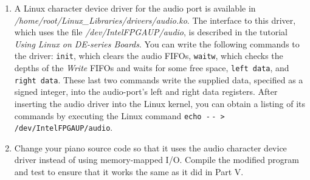 \documentclass[epsfig,10pt,fullpage]{article}
\newcommand{\CommonDocsPath}{../../common/docs}
\begin{document}
\begin{enumerate}
\item A Linux character device driver for the audio port is available in 
{\it /home/root/Linux\_Libraries/drivers/audio.ko}. The interface to this driver, which uses the
file {\it /dev/IntelFPGAUP/audio}, is described in the tutorial {\it Using Linux on 
DE-series Boards}. You can write the following commands to the driver: \texttt{init}, 
which clears the audio 
FIFOs, \texttt{waitw}, which checks the depths of the {\it Write} FIFOs and waits for some 
free space, \texttt{left data}, and \texttt{right data}. These last two commands write the 
supplied data, specified as a signed integer, into the audio-port's left and right data 
registers. After inserting the audio driver into the Linux kernel, you can obtain a listing of 
its commands by executing the Linux command \texttt{echo -$\,$- > /dev/IntelFPGAUP/audio}.
\item Change your piano source code so that it uses the audio character device driver
instead of using memory-mapped I/O. Compile the modified program and test to ensure that
it works the same as it did in Part V.
\end{enumerate}

~\\

\vskip 0.8in
\noindent
\newpage

\end{document}

